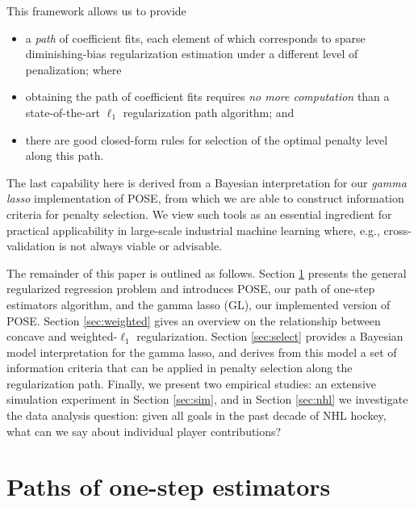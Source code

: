 \documentclass[12pt]{article}
\begin{document}
This framework allows us to provide 
\begin{itemize}
\item a {\it path} of coefficient fits, each element of which corresponds to sparse diminishing-bias regularization estimation under a different level of penalization; where
\item obtaining the path of coefficient fits requires {\it no more computation} than  a state-of-the-art $\ell_1$ regularization path algorithm; and
\item there are good closed-form rules for selection of the optimal penalty level along this path.
\end{itemize}
The last capability here is derived from a Bayesian interpretation for our \textit{gamma lasso} implementation of POSE, from which we are able to construct information criteria for penalty selection.
We view such tools as an essential ingredient for practical applicability in large-scale industrial machine learning where, e.g., cross-validation is not always viable or advisable.


The remainder of this paper is outlined as follows.  Section \ref{sec:algos}
presents the general regularized regression problem and introduces POSE, our
path of one-step estimators algorithm, and the gamma lasso (GL), our
implemented version of POSE.  Section \ref{sec:weighted} gives an overview on
the relationship between concave and weighted-$\ell_1$ regularization. Section \ref{sec:select} provides a Bayesian model interpretation
for the gamma lasso, and derives from this model a set of information criteria
that can be applied in penalty selection along the regularization path.
Finally, we present two empirical studies:
an extensive  simulation experiment in Section \ref{sec:sim}, and in Section \ref{sec:nhl} we investigate the data analysis question: given all goals in the past decade of NHL hockey, what can we say about individual player contributions? 


\section{Paths of one-step estimators}
\label{sec:algos}
\end{document}
